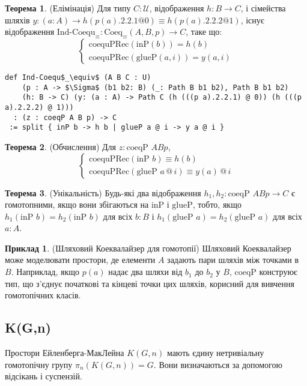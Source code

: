 \documentclass{article}
\theoremstyle{definition}
\newtheorem{theorem}{Теорема}
\newtheorem{example}{Приклад}
\begin{document}
\begin{theorem} (Елімінація)
Для типу \( C : \mathcal{U} \), відображення \( h : B \to C \),
і сімейства шляхів \( y : (a : A) \to h(p(a).2.2.1  @ 0) \equiv h(p(a).2.2.2 @ 1) \),
існує відображення \( \text{Ind-Coequ}_\equiv : \text{Coeq}_\equiv(A,B,p) \to C \), таке що:
\[
\begin{cases}
\text{coequPRec}(\text{inP}(b)) = h(b) \\
\text{coequPRec}(\text{glueP}(a,i)) = y(a,i)
\end{cases}
\]
\begin{lstlisting}[mathescape=true]
def Ind-Coequ$_\equiv$ (A B C : U)
    (p : A -> $\Sigma$ (b1 b2: B) (_: Path B b1 b2), Path B b1 b2)
    (h: B -> C) (y: (a : A) -> Path C (h (((p a).2.2.1) @ 0)) (h (((p a).2.2.2) @ 1)))
  : (z : coeqP A B p) -> C
 := split { inP b -> h b | glueP a @ i -> y a @ i }
\end{lstlisting}
\end{theorem}

\begin{theorem} (Обчислення)
Для \( z : \text{coeqP } A B p \),
\[
\begin{cases}
\text{coequPRec}(\text{inP } b) \equiv h(b) \\
\text{coequPRec}(\text{glueP } a \, @ \, i) \equiv y(a) \, @ \, i
\end{cases}
\]
\end{theorem}

\begin{theorem} (Унікальність)
Будь-які два відображення \( h_1, h_2 : \text{coeqP } A B p \to C \) є гомотопними,
якщо вони збігаються на \( \text{inP} \) і \( \text{glueP} \), тобто,
якщо \( h_1(\text{inP } b) = h_2(\text{inP } b) \) для всіх \( b : B \)
і \( h_1(\text{glueP } a) = h_2(\text{glueP } a) \) для всіх \( a : A \).
\end{theorem}

\begin{example} (Шляховий Коеквалайзер для гомотопії)
Шляховий Коеквалайзер може моделювати простори, де елементи \( A \) задають
пари шляхів між точками в \( B \). Наприклад, якщо \( p(a) \) надає
два шляхи від \( b_1 \) до \( b_2 \) у \( B \), \( \text{coeqP} \) конструює тип,
що з’єднує початкові та кінцеві точки цих шляхів,
корисний для вивчення гомотопічних класів.
\end{example}

\newpage
\subsection{K(G,n)}
Простори Ейленберга-МакЛейна \( K(G,n) \) мають єдину нетривіальну
гомотопічну групу \( \pi_n(K(G,n)) = G \). Вони визначаються за допомогою відсікань і суспензій.
\end{document}

